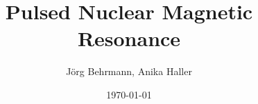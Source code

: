 \documentclass{a4paper,twoside,11pt}[scrartcl]
\begin{document}
\title{Pulsed Nuclear Magnetic Resonance}
\author{J\"org Behrmann, Anika Haller}
\date{\today}
\maketitle
\tableofcontents
\thispagestyle{empty}
\cleardoublepage

\end{document}

